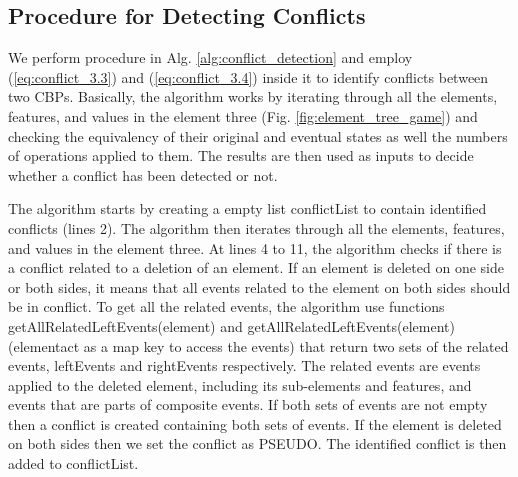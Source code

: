 \subsection{Procedure for Detecting Conflicts} 
\label{sec:procedure_for_detecting_conflicts} 
We perform procedure in Alg. \ref{alg:conflict_detection} and employ (\ref{eq:conflict_3.3}) and (\ref{eq:conflict_3.4}) inside it to identify conflicts between two CBPs. Basically, the algorithm works by iterating through all the elements, features, and values in the element three (Fig. \ref{fig:element_tree_game}) and checking the equivalency of their original and eventual states as well the numbers of operations applied to them. The results are then used as inputs to decide whether a conflict has been detected or not.

The algorithm starts by creating a empty list \textsf{conflictList} to contain identified conflicts (lines 2). 
The algorithm then iterates through all the elements, features, and values in the element three. 
At lines 4 to 11, the algorithm checks if there is a conflict related to a deletion of an element.
If an element is deleted on one side or both sides, it means that all events related to the element on both sides should be in conflict. 
To get all the related events, the algorithm use functions \textsf{getAllRelatedLeftEvents(element)} 
and \textsf{getAllRelatedLeftEvents(element)} (elementact as a map key to access the events) that return two sets of the related events, 
\textsf{leftEvents} and \textsf{rightEvents} respectively. The related events are events applied to the deleted element, including its sub-elements and features, 
and events that are parts of composite events. If both sets of events are not empty then a conflict is created containing both sets of events. 
If the element is deleted on both sides then we set the conflict as \textsf{PSEUDO}. The identified conflict is then added to \textsf{conflictList}.

